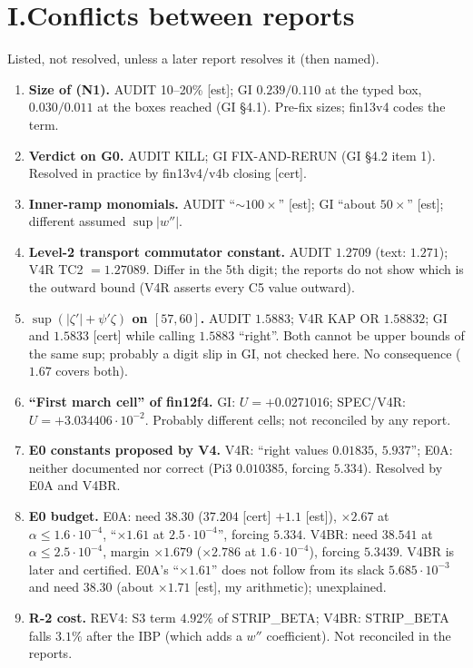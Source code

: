 \documentclass[10pt]{article}
\newcommand{\fn}[1]{\texttt{\detokenize{#1}}}
\newcommand{\cert}{\textup{[cert]}}
\newcommand{\est}{\textup{[est]}}
\begin{document}
\section*{I.\quad Conflicts between reports}
Listed, not resolved, unless a later report resolves it (then named).
\begin{enumerate}
\item \textbf{Size of (N1).} AUDIT 10--20\% \est; GI $0.239/0.110$ at the typed box, $0.030/0.011$ at the boxes reached (GI \S4.1). Pre-fix sizes; fin13v4 codes the term.
\item \textbf{Verdict on G0.} AUDIT KILL; GI FIX-AND-RERUN (GI \S4.2 item 1). Resolved in practice by fin13v4/v4b closing \cert.
\item \textbf{Inner-ramp monomials.} AUDIT ``$\sim100\times$'' \est; GI ``about $50\times$'' \est; different assumed $\sup|w''|$.
\item \textbf{Level-2 transport commutator constant.} AUDIT $1.2709$ (text: $1.271$); V4R TC2 $=1.27089$. Differ in the 5th digit; the reports do not show which is the outward bound (V4R asserts every C5 value outward).
\item \textbf{$\sup(|\zeta'|+\psi'\zeta)$ on $[57,60]$.} AUDIT $1.5883$; V4R KAP OR $1.58832$; GI and \fn{check_kappa_outer.py} $1.5833$ \cert{} while calling $1.5883$ ``right''. Both cannot be upper bounds of the same sup; probably a digit slip in GI, not checked here. No consequence ($1.67$ covers both).
\item \textbf{``First march cell'' of fin12f4.} GI: $U=+0.0271016$; SPEC/V4R: $U=+3.034406\cdot10^{-2}$. Probably different cells; not reconciled by any report.
\item \textbf{E0 constants proposed by V4.} V4R: ``right values $0.01835$, $5.937$''; E0A: neither documented nor correct (Pi3 $0.010385$, forcing $5.334$). Resolved by E0A and V4BR.
\item \textbf{E0 budget.} E0A: need $38.30$ ($37.204$ \cert{} $+1.1$ \est), $\times2.67$ at $\alpha\le1.6\cdot10^{-4}$, ``$\times1.61$ at $2.5\cdot10^{-4}$'', forcing $5.334$. V4BR: need $38.541$ at $\alpha\le2.5\cdot10^{-4}$, margin $\times1.679$ ($\times2.786$ at $1.6\cdot10^{-4}$), forcing $5.3439$. V4BR is later and certified. E0A's ``$\times1.61$'' does not follow from its slack $5.685\cdot10^{-3}$ and need $38.30$ (about $\times1.71$ \est, my arithmetic); unexplained.
\item \textbf{R-2 cost.} REV4: S3 term $4.92\%$ of STRIP\_BETA; V4BR: STRIP\_BETA falls $3.1\%$ after the IBP (which adds a $w''$ coefficient). Not reconciled in the reports.

\end{enumerate}
\end{document}
